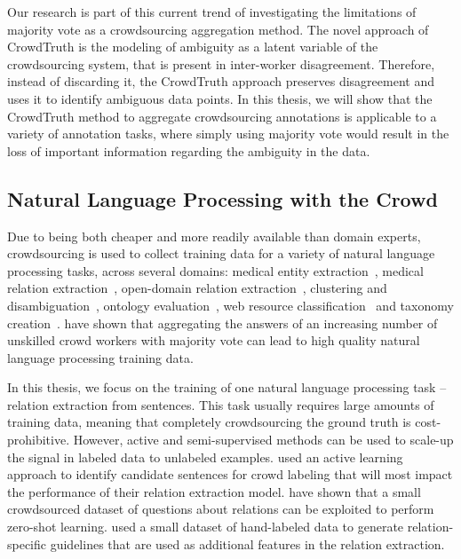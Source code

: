 Our research is part of this current trend of investigating the limitations of majority vote as a crowdsourcing aggregation method. The novel approach of CrowdTruth is the modeling of ambiguity as a latent variable of the crowdsourcing system, that is present in inter-worker disagreement. Therefore, instead of discarding it, the CrowdTruth approach preserves disagreement and uses it to identify ambiguous data points. In this thesis, we will show that the CrowdTruth method to aggregate crowdsourcing annotations is applicable to a variety of annotation tasks, where simply using majority vote would result in the loss of important information regarding the ambiguity in the data.


\subsection{Natural Language Processing with the Crowd}

Due to being both cheaper and more readily available than domain experts, crowdsourcing is used to collect training data for a variety of natural language processing tasks, across several domains: medical entity extraction~\cite{zhai2013web,Finin2010,van2012eu}, medical relation extraction~\cite{kilicoglu2011constructing,van2012eu}, open-domain relation extraction~\cite{kondreddi2014combining}, clustering and disambiguation~\cite{Lee2013}, ontology evaluation~\cite{noy2013mechanical}, web resource classification~\cite{castano2016human} and taxonomy creation~\cite{bragg2013crowdsourcing}. \citet{Snow2008} have shown that aggregating the answers of an increasing number of unskilled crowd workers with majority vote can lead to high quality natural language processing training data.

In this thesis, we focus on the training of one natural language processing task -- relation extraction from sentences. This task usually requires large amounts of training data, meaning that completely crowdsourcing the ground truth is cost-prohibitive. However, active and semi-supervised methods can be used to scale-up the signal in labeled data to unlabeled examples. \citet{angeli2014combining} used an active learning approach to identify candidate sentences for crowd labeling that will most impact the performance of their relation extraction model. \citet{levy2017zero} have shown that a small crowdsourced dataset of questions about relations can be exploited to perform zero-shot learning. \citet{pershina2014infusion} used a small dataset of hand-labeled data to generate relation-specific guidelines that are used as additional features in the relation extraction.


